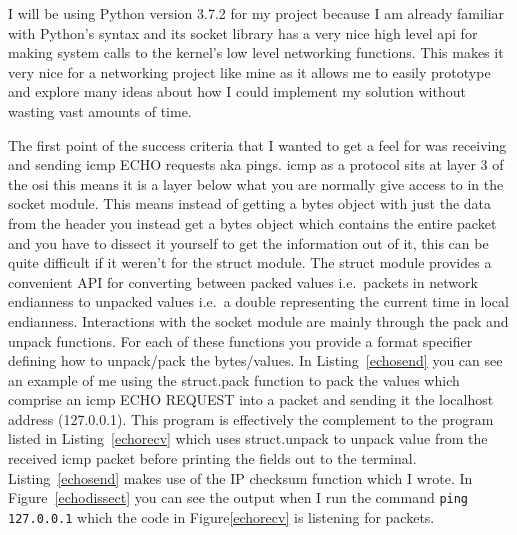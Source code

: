 \documentclass[titlepage]{article}
\begin{document}
I will be using Python version 3.7.2 for my project because I am already familiar with Python's
syntax and its socket library has a very nice high level \gls{api} for making system calls to
the kernel's low level networking functions. This makes it very nice for a networking project
like mine as it allows me to easily prototype and explore many ideas about how I could implement
my solution without wasting vast amounts of time.

The first point of the success criteria that I wanted to get a feel for was receiving and sending
\gls{icmp} ECHO requests aka pings. \gls{icmp} as a protocol sits at layer 3 of the \gls{osi}
this means it is a layer below what you are normally give access to in the socket module. This
means instead of getting a bytes object with just the data from the header you instead get a bytes
object which contains the entire packet and you have to dissect it yourself to get the information
out of it, this can be quite difficult if it weren't for the struct module. The struct module 
provides a convenient API for converting between packed values i.e.\ packets in network endianness
to unpacked values i.e.\ a double representing the current time in local endianness. Interactions
with the socket module are mainly through the pack and unpack functions. For each of these
functions you provide a format specifier defining how to unpack/pack the bytes/values. 
In Listing~\ref{echosend} you can see an example of me using the struct.pack function to pack
the values which comprise an \gls{icmp} ECHO REQUEST into a packet and sending it the localhost
address (127.0.0.1). This program is effectively the complement to the program listed in
Listing~\ref{echorecv} which uses struct.unpack to unpack value from the received \gls{icmp}
packet before printing the fields out to the terminal. Listing~\ref{echosend} makes use of the
IP checksum function which I wrote. In Figure~\ref{echodissect} you can see the output when
I run the command \verb|ping 127.0.0.1| which the code in Figure\ref{echorecv} is listening for
packets.

\begin{algorithm}
\begin{algorithmic}[1]
\MakeRobust{\Call}
\end{algorithmic}
\caption{\textit{%
  The psuedocode representation of Listing~\ref{echosend}.
}}
\end{algorithm}
\end{document}
